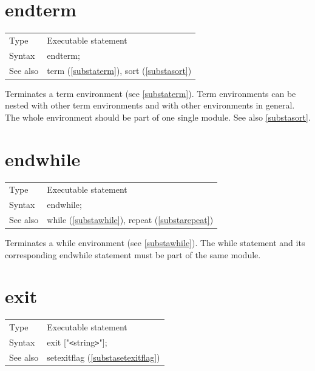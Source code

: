 \vspace{10mm}
%

\section{endterm}
\label{substaendterm}

\noindent \begin{tabular}{ll}
Type & Executable statement\\
Syntax & endterm;
\\ See also & term (\ref{substaterm}), sort (\ref{substasort})
\end{tabular} \vspace{4mm}

\noindent Terminates a term environment 
(see \ref{substaterm}). Term environments can be nested with 
other term environments and with other environments in general. The whole 
environment should be part of one single module. See also \ref{substasort}. 
\vspace{10mm}


\section{endwhile}
\label{substaendwhile}

\noindent \begin{tabular}{ll}
Type & Executable statement\\
Syntax & endwhile;
\\ See also & while (\ref{substawhile}), repeat (\ref{substarepeat})
\end{tabular} \vspace{4mm}

\noindent Terminates a while environment (see \ref{substawhile}). The while 
statement and its corresponding endwhile statement must be part of the same 
module. \vspace{10mm}


\section{exit}
\label{substaexit}

\noindent \begin{tabular}{ll}
Type & Executable statement\\
Syntax & exit ["{\tt<}string{\tt>}"];
\\ See also & setexitflag (\ref{substasetexitflag})
\end{tabular} \vspace{4mm}

